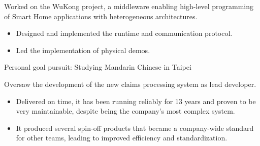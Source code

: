 \documentclass[10pt,a4paper]{../altacv}
\begin{document}
	\medskip
	
	
	\medskip
	

	\medskip

	Worked on the WuKong project, a middleware enabling high-level programming of Smart Home applications with heterogeneous architectures.
	
	\begin{itemize}
		\item Designed and implemented the runtime and communication protocol.
		\smallskip
		\item Led the implementation of physical demos.
	\end{itemize}
	
	\medskip
	
	
	\medskip
	
	
	
	
	\bigskip\bigskip{}
	
	Personal goal pursuit: Studying Mandarin Chinese in Taipei
	
	
	\newpage


	\bigskip\bigskip{}
	
	Oversaw the development of the new claims processing system as lead developer.
	
	\medskip
	
	\begin{itemize}
		\item Delivered on time, it has been running reliably for 13 years and proven to be very maintainable, despite being the company's most complex system.
		\smallskip
		\item It produced several spin-off products that became a company-wide standard for other teams, leading to improved efficiency and standardization.
	\end{itemize}
	
	\medskip
	
	
	\medskip
	
\end{document}
